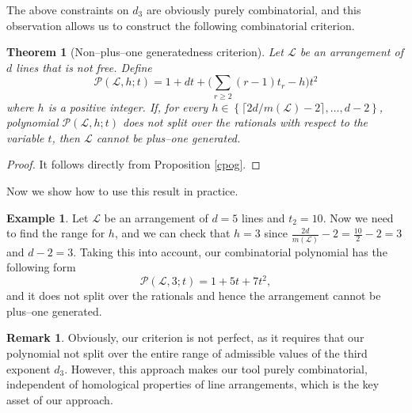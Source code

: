 \documentclass[12pt]{article}
\theoremstyle{plain}
\newtheorem{theorem}[thm]{Theorem}
\theoremstyle{definition}
\newtheorem{remark}[thm]{Remark}
\newtheorem{example}[thm]{Example}
\begin{document}
The above constraints on $d_{3}$ are obviously purely combinatorial, and this observation allows us to construct the following combinatorial criterion.
\begin{theorem}[Non--plus--one generatedness criterion]
\label{npog}
Let $\mathcal{L}$ be an arrangement of $d$ lines that is not free. Define 
$$\mathcal{P}(\mathcal{L},h;t) = 1 + dt + \bigg(\sum_{r\geq 2}(r-1)t_{r}-h\bigg)t^{2}$$
where $h$ is a positive integer. If, for every $h \in \left\{ \lceil 2d / m(\mathcal{L}) -2 \rceil, \ldots , d-2\right\}$, polynomial $\mathcal{P}(\mathcal{L},h;t)$ does not split over the rationals with respect to the variable $t$, then $\mathcal{L}$ cannot be plus--one generated.
\end{theorem}
\begin{proof}
It follows directly from Proposition \ref{cpog}.
\end{proof}
Now we show how to use this result in practice. 
\begin{example}
Let $\mathcal{L}$ be an arrangement of $d=5$ lines and $t_{2}=10$. Now we need to find the range for $h$, and we can check that $h=3$ since $\frac{2d}{m(\mathcal{L})}-2 =\frac{10}{2}-2 = 3$ and $d-2=3$. Taking this into account, our combinatorial polynomial has the following form
$$\mathcal{P}(\mathcal{L},3;t) = 1 + 5t + 7t^{2},$$
and it does not split over the rationals and hence the arrangement cannot be plus--one generated. 
\end{example}
\begin{remark}
Obviously, our criterion is not perfect, as it requires that our polynomial not split over the entire range of admissible values of the third exponent $d_{3}$. However, this approach makes our tool purely combinatorial, independent of homological properties of line arrangements, which is the key asset of our approach.
\end{remark}
\end{document}
